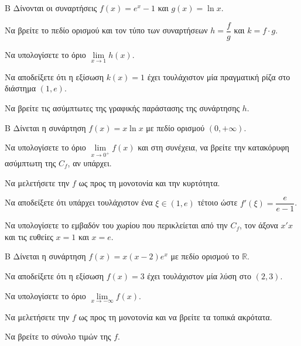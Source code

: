 \begin{thema}{Β}
Δίνονται οι συναρτήσεις $f(x) = e^x - 1$ και $g(x) = \ln x$. 
\begin{erwthma}
\item Να βρείτε το πεδίο ορισμού και τον τύπο των συναρτήσεων $h = \dfrac{f}{g}$ και $k = f \cdot g$.
\item Να υπολογίσετε το όριο $\lim\limits_{x \to 1} h(x)$.
\item Να αποδείξετε ότι η εξίσωση $k(x) = 1$ έχει τουλάχιστον μία πραγματική ρίζα στο διάστημα $(1, e)$.
\item Να βρείτε τις ασύμπτωτες της γραφικής παράστασης της συνάρτησης $h$.
\end{erwthma}
\end{thema}

\begin{thema}{Β}
Δίνεται η συνάρτηση $f(x) = x \ln x$ με πεδίο ορισμού $(0, +\infty)$.
\begin{erwthma}
\item Να υπολογίσετε το όριο $\lim\limits_{x \to 0^+} f(x)$ και στη συνέχεια, να βρείτε την κατακόρυφη ασύμπτωτη της $C_f$, αν υπάρχει.
\item Να μελετήσετε την $f$ ως προς τη μονοτονία και την κυρτότητα.
\item Να αποδείξετε ότι υπάρχει τουλάχιστον ένα $\xi \in (1, e)$ τέτοιο ώστε $f'(\xi) = \dfrac{e}{e-1}$.
\item Να υπολογίσετε το εμβαδόν του χωρίου που περικλείεται από την $C_f$, τον άξονα $x'x$ και τις ευθείες $x=1$ και $x=e$.
\end{erwthma}
\end{thema}

\begin{thema}{Β}
Δίνεται η συνάρτηση $f(x) = x(x-2)e^x$ με πεδίο ορισμού το $\mathbb{R}$.
\begin{erwthma}
\item Να αποδείξετε ότι η εξίσωση $f(x) = 3$ έχει τουλάχιστον μία λύση στο $(2, 3)$.
\item Να υπολογίσετε το όριο $\lim\limits_{x \to -\infty} f(x)$.
\item Να μελετήσετε την $f$ ως προς τη μονοτονία και να βρείτε τα τοπικά ακρότατα.
\item Να βρείτε το σύνολο τιμών της $f$.
\end{erwthma}
\end{thema}

